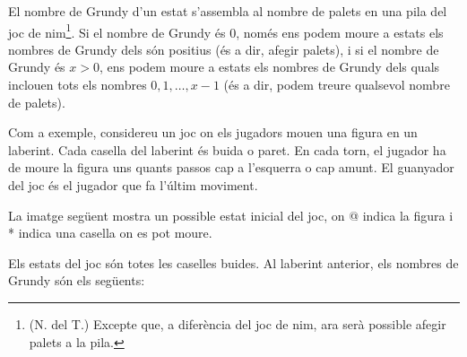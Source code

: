 El nombre de Grundy d'un estat s'assembla al nombre de palets en una
pila del joc de nim\footnote{(N. del T.) Excepte que, a diferència del
joc de nim, ara serà possible afegir palets a la pila.}. Si el nombre
de Grundy és 0, només ens podem moure a estats els nombres de Grundy
dels són positius (és a dir, afegir palets), i si el nombre de Grundy
és $x>0$, ens podem moure a estats els nombres de Grundy dels quals
inclouen tots els nombres $0,1,\ldots,x -1$ (és a dir, podem treure
qualsevol nombre de palets).

Com a exemple, considereu un joc on els jugadors mouen una figura en
un laberint. Cada casella del laberint és buida o paret. En cada torn,
el jugador ha de moure la figura uns quants passos cap a l'esquerra o
cap amunt. El guanyador del joc és el jugador que fa l'últim moviment.

La imatge següent mostra un possible estat inicial del joc, on @
indica la figura i * indica una casella on es pot moure.


\begin{center}
\end{center}


Els estats del joc són totes les caselles buides. Al laberint
anterior, els nombres de Grundy són els següents:


